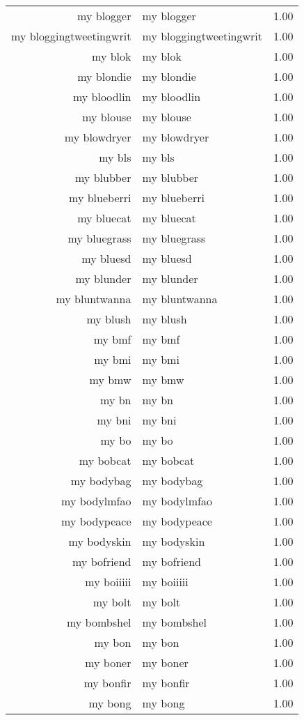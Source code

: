\begin{table}[ht]
\begin{tabular}{rlr}
  my blogger & my blogger & 1.00 \\ 
  my bloggingtweetingwrit & my bloggingtweetingwrit & 1.00 \\ 
  my blok & my blok & 1.00 \\ 
  my blondie & my blondie & 1.00 \\ 
  my bloodlin & my bloodlin & 1.00 \\ 
  my blouse & my blouse & 1.00 \\ 
  my blowdryer & my blowdryer & 1.00 \\ 
  my bls & my bls & 1.00 \\ 
  my blubber & my blubber & 1.00 \\ 
  my blueberri & my blueberri & 1.00 \\ 
  my bluecat & my bluecat & 1.00 \\ 
  my bluegrass & my bluegrass & 1.00 \\ 
  my bluesd & my bluesd & 1.00 \\ 
  my blunder & my blunder & 1.00 \\ 
  my bluntwanna & my bluntwanna & 1.00 \\ 
  my blush & my blush & 1.00 \\ 
  my bmf & my bmf & 1.00 \\ 
  my bmi & my bmi & 1.00 \\ 
  my bmw & my bmw & 1.00 \\ 
  my bn & my bn & 1.00 \\ 
  my bni & my bni & 1.00 \\ 
  my bo & my bo & 1.00 \\ 
  my bobcat & my bobcat & 1.00 \\ 
  my bodybag & my bodybag & 1.00 \\ 
  my bodylmfao & my bodylmfao & 1.00 \\ 
  my bodypeace & my bodypeace & 1.00 \\ 
  my bodyskin & my bodyskin & 1.00 \\ 
  my bofriend & my bofriend & 1.00 \\ 
  my boiiiii & my boiiiii & 1.00 \\ 
  my bolt & my bolt & 1.00 \\ 
  my bombshel & my bombshel & 1.00 \\ 
  my bon & my bon & 1.00 \\ 
  my boner & my boner & 1.00 \\ 
  my bonfir & my bonfir & 1.00 \\ 
  my bong & my bong & 1.00 \\ 

\end{tabular}
\end{table}
